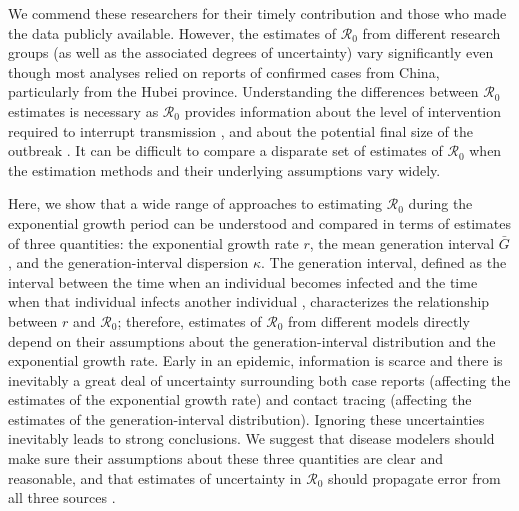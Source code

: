 \documentclass[12pt]{article}
\newcommand{\Ro}{\ensuremath{{\mathcal R}_{0}}\xspace}
\begin{document}
We commend these researchers for their timely contribution and those who made the data publicly available.
However, the estimates of \Ro from different research groups (as well as the associated degrees of uncertainty) vary significantly even though most analyses relied on reports of confirmed cases from China, particularly from the Hubei province.
Understanding the differences between \Ro estimates is necessary as \Ro provides information about the level of intervention required to interrupt transmission \citep{anderson1991infectious}, and about the potential final size of the outbreak \citep{anderson1991infectious, ma2006generality}.
It can be difficult to compare a disparate set of estimates of \Ro when the estimation methods and their underlying assumptions vary widely.

Here, we show that a wide range of approaches to estimating \Ro during the exponential growth period can be understood and compared in terms of estimates of three quantities: the exponential growth rate $r$, the mean generation interval $\bar G$, and the generation-interval dispersion $\kappa$.
The generation interval, defined as the interval between the time when an individual becomes infected and the time when that individual infects another individual \citep{svensson2007note}, characterizes the relationship between $r$ and \Ro \citep{wearing2005appropriate, roberts2007model, wallinga2007generation, park2019practical};
therefore, estimates of \Ro from different models directly depend on their assumptions about the generation-interval distribution and the exponential growth rate.
Early in an epidemic, information is scarce and there is inevitably a great deal of uncertainty surrounding both case reports (affecting the estimates of the exponential growth rate) and contact tracing (affecting the estimates of the generation-interval distribution).
Ignoring these uncertainties inevitably leads to strong conclusions.
We suggest that disease modelers should make sure their assumptions about these three quantities are clear and reasonable, and that estimates of uncertainty in \Ro should propagate error from all three sources \citep{elderd2006uncertainty}.
\end{document}
